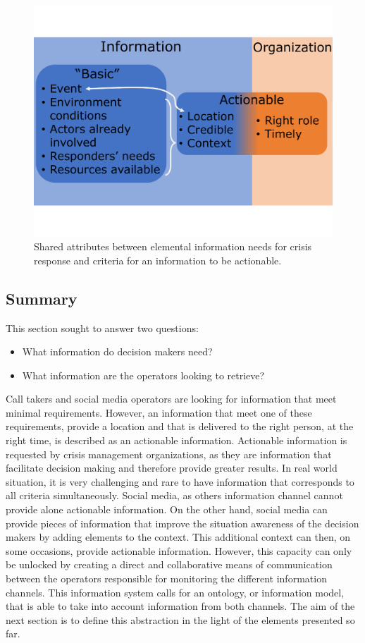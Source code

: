 \begin{figure}[htb]
    \centering
    \includegraphics[width=\textwidth]{figures/chap-3/sa-ainf.pdf}
    \caption{Shared attributes between elemental information needs for crisis response and criteria for an information to be actionable.}
    \label{information:sa-inf}
\end{figure}

\subsection*{Summary}
This section sought to answer two questions:
\begin{itemize}
    \item What information do decision makers need?
    \item What information are the operators looking to retrieve?
\end{itemize}
Call takers and social media operators are looking for information that meet minimal requirements.
However, an information that meet one of these requirements, provide a location and that is delivered
to the right person, at the right time, is described as an actionable information.
Actionable information is requested by crisis management organizations, as they are information that
facilitate decision making and therefore provide greater results.
In real world situation, it is very challenging and rare to have information that corresponds to all criteria simultaneously.
Social media, as others information channel cannot provide alone actionable information.
On the other hand, social media can provide pieces of information that improve the situation
awareness of the decision makers by adding elements to the context.
This additional context can then, on some occasions, provide actionable information.
However, this capacity can only be unlocked by creating a direct and collaborative means
of communication between the operators responsible for monitoring the different information channels.
This information system calls for an ontology, or information model, that is able to take
into account information from both channels.
The aim of the next section is to define this abstraction in the light of the elements
presented so far.

